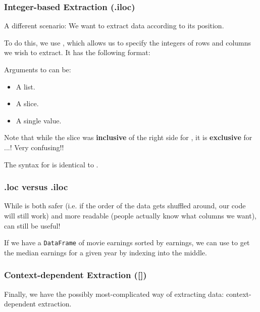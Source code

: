 \documentclass[openany]{book}
\begin{document}
\subsubsection{Integer-based Extraction (.iloc)}
A different scenario: We want to extract data according to its position.

To do this, we use , which allows us to specify the integers of rows and columns we wish to extract. It has the following format:
\begin{center}
\end{center}

Arguments to  can be:
\begin{itemize}
	\item A list.
	\item A slice.
	\item A single value.
\end{itemize}
\begin{warn}
	Note that while the slice was \textbf{inclusive} of the right side for , it is \textbf{exclusive} for ...! Very confusing!!
\end{warn}

The syntax for  is identical to .

\subsubsection{.loc versus .iloc}
While  is both safer (i.e. if the order of the data gets shuffled around, our code will still work) and more readable (people actually know what columns we want),  can still be useful!

\begin{example}
	If we have a \texttt{DataFrame} of movie earnings sorted by earnings, we can use  to get the median earnings for a given year by indexing into the middle.
\end{example}

\subsubsection{Context-dependent Extraction ([])}
Finally, we have the possibly most-complicated way of extracting data: context-dependent extraction.
\end{document}
